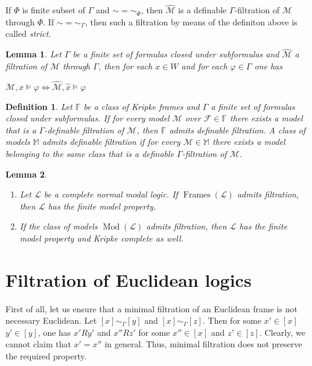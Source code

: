 \documentclass[a4paper]{article}
\theoremstyle{defin}
\newtheorem{defin}{Definition}
\theoremstyle{theorem}
\theoremstyle{prop}
\theoremstyle{lemma}
\newtheorem{lemma}{Lemma}
\theoremstyle{fact}
\theoremstyle{ex}
\theoremstyle{col}
\begin{document}
If $\Phi$ is finite subset of $\Gamma$ and $\sim = \sim_{\Phi}$, then $\widehat{\mathcal{M}}$ is a definable $\Gamma$-filtration of $\mathcal{M}$ through $\Phi$. If $\sim = \sim_{\Gamma}$, then such a filtration by means of the definiton above is called \emph{strict}.

\begin{lemma}
  Let $\Gamma$ be a finite set of formulas closed under subformulas and $\widehat{\mathcal{M}}$ a filtration of $\mathcal{M}$ through $\Gamma$, then for each $x \in W$ and for each $\varphi \in \Gamma$ one has
  \begin{center}
    $\mathcal{M}, x \models \varphi \Leftrightarrow \widehat{\mathcal{M}}, \hat{x} \models \varphi$
  \end{center}
\end{lemma}

\begin{defin} Let $\mathbb{F}$ be a class of Kripke frames and $\Gamma$ a finite set of formulas closed under subformulas. If for every model $\mathcal{M}$ over $\mathcal{F} \in \mathbb{F}$ there exists a model that is a $\Gamma$-definable filtration of $\mathcal{M}$, then $\mathbb{F}$ admits definable filtration. A class of models $\mathbb{M}$ admits definable filtration if for every $\mathcal{M} \in \mathbb{M}$ there exists a model belonging to the same class that is a definable $\Gamma$-filtration of $\mathcal{M}$.
\end{defin}

\begin{lemma}
  $ $

\begin{enumerate}
  \item Let $\mathcal{L}$ be a complete normal modal logic. If $\operatorname{Frames}(\mathcal{L})$ admits filtration, then $\mathcal{L}$ has the finite model property.
  \item If the class of models $\operatorname{Mod}(\mathcal{L})$ admits filtration, then $\mathcal{L}$ has the finite model property and Kripke complete as well.
\end{enumerate}
\end{lemma}

\section{Filtration of Euclidean logics}

First of all, let us ensure that a minimal filtration of an Euclidean frame is not necessary Euclidean.
Let $[x] \sim_{\Gamma} [y]$ and $[x] \sim_{\Gamma} [z]$. Then for some $x' \in [x]$ $y' \in [y]$, one has
$x' R y'$ and $x'' R z'$ for some $x'' \in [x]$ and $z' \in [z]$. Clearly, we cannot claim that $x' = x''$ in general. Thus, minimal filtration does not preserve the required property.
\end{document}
